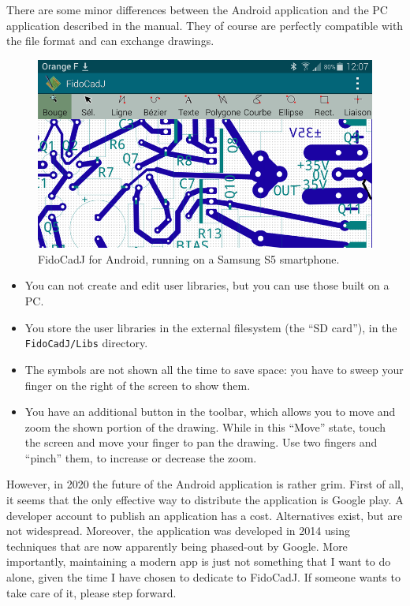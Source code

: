 \documentclass[10pt,a4paper,twoside]{scrreprt}
\begin{document}
There are some minor differences between the Android application and the PC application described in the manual. They of course are perfectly compatible with the file format and can exchange drawings.
\begin{figure}
\centering
\includegraphics[width=.8\textwidth]{fidocadj_s5}
\caption{FidoCadJ for Android, running on a Samsung S5 smartphone.}
\label{fig_fidocadj_s5}
\end{figure}

\begin{itemize}
\item You can not create and edit user libraries, but you can use those built on a PC.
\item You store the user libraries in the external filesystem (the ``SD card''), in the \lstinline!FidoCadJ/Libs! directory.
\item The symbols are not shown all the time to save space: you have to sweep your finger on the right of the screen to show them.
\item You have an additional button in the toolbar, which allows you to move and zoom the shown portion of the drawing. While in this ``Move'' state, touch the screen and move your finger to pan the drawing. Use two fingers and ``pinch'' them, to increase or decrease the zoom.
\end{itemize}

However, in 2020 the future of the Android application is rather grim. First of all, it seems that the only effective way to distribute the application is Google play. A developer account to publish an application has a cost. Alternatives exist, but are not widespread. Moreover, the application was developed in 2014 using techniques that are now apparently being phased-out by Google. More importantly, maintaining a modern app is just not something that I want to do alone, given the time I have chosen to dedicate to FidoCadJ. If someone wants to take care of it, please step forward.
\end{document}
